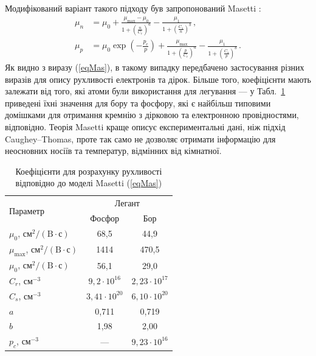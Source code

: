 \documentclass[12pt,a4paper,titlepage,oneside]{book}
\numberwithin{equation}{part}
\begin{document}
Модифікований варіант такого підходу був запропонований Masetti \cite{Masetti1983}:
\begin{equation}\label{eqMas}
\begin{aligned}
    \mu_n &=\mu_0+\frac{\mu_\mathrm{max}-\mu_0}{1+\left(\frac{n}{C_r}\right)^a}-\frac{\mu_1}{1+\left(\frac{C_s}{n}\right)^b}\,, \\
   \mu_p &=\mu_0\exp\left(-\frac{p_c}{p}\right)+\frac{\mu_\mathrm{max}}{1+\left(\frac{p}{C_r}\right)^a}-\frac{\mu_1}{1+\left(\frac{C_s}{p}\right)^b}\,.
\end{aligned}
\end{equation}
Як видно з виразу (\ref{eqMas}), в такому випадку передбачено застосування різних виразів для опису рухливості електронів та дірок.
Більше того, коефіцієнти мають залежати від того, які атоми були використання для легування --- у Табл.~\ref{tblMas} приведені
їхні значення для бору та фосфору, які є найбільш типовими домішками для отримання кремнію з дірковою та електронною провідностями, відповідно.
Теорія Masetti краще описує експериментальні дані, ніж підхід  Caughey--Thomas, проте так само не дозволяє отримати інформацію для неосновних носіїв та
температур, відмінних від кімнатної.

\begin{table}
\caption{Коефіцієнти для розрахунку рухливості відповідно до моделі Masetti (\ref{eqMas})}
\label{tblMas}
\centering
\begin{tabular}{|l|c|c|}
\hline
\multirow{2}{*}{Параметр} & \multicolumn{2}{c|}{Легант} \\
\cline{2-3}
&Фосфор&Бор\\
\hline
$\mu_0$, $\text{см}^2/(\text{B}\cdot\text{с})$&68,5&44,9\\
\hline
$\mu_\mathrm{max}$, $\text{см}^2/(\text{B}\cdot\text{с})$&1414&470,5\\
\hline
$\mu_0$, $\text{см}^2/(\text{B}\cdot\text{с})$&56,1&29,0\\
\hline
$C_r$, см$^{-3}$&$9,2\cdot10^{16}$&$2,23\cdot10^{17}$\\
\hline
$C_s$, см$^{-3}$&$3,41\cdot10^{20}$&$6,10\cdot10^{20}$\\
\hline
$a$&0,711&0,719\\
\hline
$b$&1,98&2,00\\
\hline
$p_c$, см$^{-3}$&---&$9,23\cdot10^{16}$\\
\hline
\end{tabular}
\end{table}
\end{document}
